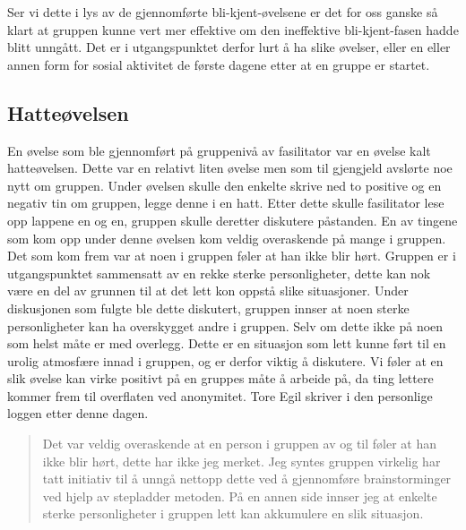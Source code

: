 Ser vi dette i lys av de gjennomførte bli-kjent-øvelsene er det for oss ganske så klart at gruppen kunne vert mer effektive om den ineffektive bli-kjent-fasen hadde blitt unngått. 
Det er i utgangspunktet derfor lurt å ha slike øvelser, eller en eller annen form for sosial aktivitet de første dagene etter at en gruppe er startet. 

\subsection{Hatteøvelsen}
En øvelse som ble gjennomført på gruppenivå av fasilitator var en øvelse kalt hatteøvelsen. 
Dette var en relativt liten øvelse men som til gjengjeld avslørte noe nytt om gruppen. 
Under øvelsen skulle den enkelte skrive ned to positive og en negativ tin om gruppen, legge denne i en hatt. 
Etter dette skulle fasilitator lese opp lappene en og en, gruppen skulle deretter diskutere påstanden. 
En av tingene som kom opp under denne øvelsen kom veldig overaskende på mange i gruppen. 
Det som kom frem var at noen i gruppen føler at han ikke blir hørt. 
Gruppen er i utgangspunktet sammensatt av en rekke sterke personligheter, 
dette kan nok være en del av grunnen til at det lett kon oppstå slike situasjoner. 
Under diskusjonen som fulgte ble dette diskutert, gruppen innser at noen sterke personligheter kan ha overskygget andre i gruppen. 
Selv om dette ikke på noen som helst måte er med overlegg. 
Dette er en situasjon som lett kunne ført til en urolig atmosfære innad i gruppen, og er derfor viktig å diskutere. 
Vi føler at en slik øvelse kan virke positivt på en gruppes måte å arbeide på, da ting lettere kommer frem til overflaten ved anonymitet. 
Tore Egil skriver i den personlige loggen etter denne dagen.
\begin{quote}
Det var veldig overaskende at en person i gruppen av og til føler at han ikke blir hørt, dette har ikke jeg merket. 
Jeg syntes gruppen virkelig har tatt initiativ til å unngå nettopp dette ved å gjennomføre brainstorminger ved hjelp av stepladder metoden. 
På en annen side innser jeg at enkelte sterke personligheter i gruppen lett kan akkumulere en slik situasjon. 
\end{quote}

